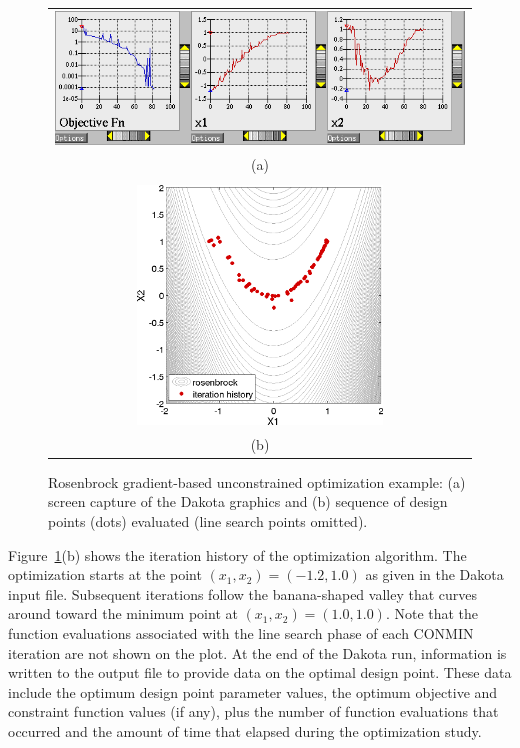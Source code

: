 \begin{figure}[ht!]
  \centering
  \begin{tabular}{c}
  \includegraphics[width=\textwidth]{images/dak_graphics_grad_opt}\\
  (a)\\
  \qquad\\
  \includegraphics[height=2.5in]{images/rosen_grad_opt_pts} \\
  (b)
  \end{tabular}
  \caption{Rosenbrock gradient-based unconstrained optimization
    example: (a) screen capture of the Dakota graphics and (b)
    sequence of design points (dots) evaluated (line search points
    omitted).}
  \label{tutorial:rosenbrock_grad_graphics}
\end{figure}

Figure~\ref{tutorial:rosenbrock_grad_graphics}(b) shows the
iteration history of the optimization algorithm. The optimization
starts at the point $(x_1,x_2) = (-1.2,1.0)$ as given in the
Dakota input file. Subsequent iterations follow the banana-shaped
valley that curves around toward the minimum point at $(x_1,x_2) =
(1.0,1.0)$. Note that the function evaluations associated with the
line search phase of each CONMIN iteration are not shown on the plot.
At the end of the Dakota run, information is written to the output
file to provide data on the optimal design point. These data include
the optimum design point parameter values, the optimum objective and
constraint function values (if any), plus the number of function
evaluations that occurred and the amount of time that elapsed during
the optimization study.

